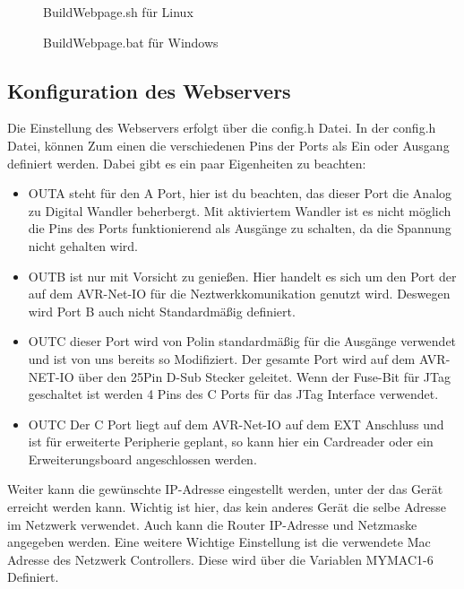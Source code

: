 \begin{figure}[H]

\caption{BuildWebpage.sh für Linux}
\label{output}
\end{figure}

\begin{figure}[H]

\caption{BuildWebpage.bat für Windows}
\label{output}
\end{figure}

\subsection{Konfiguration des Webservers}

Die Einstellung des Webservers erfolgt über die \textrm{config.h} Datei. In der
\textrm{config.h} Datei, können Zum einen die verschiedenen Pins der Ports als Ein oder
Ausgang definiert werden. Dabei gibt es ein paar Eigenheiten zu beachten:
\begin{itemize}
  \item OUTA steht für den A Port, hier ist du beachten, das dieser Port die
  Analog zu Digital Wandler beherbergt. Mit aktiviertem Wandler ist es nicht
  möglich die Pins des Ports funktionierend als Ausgänge zu schalten, da die
  Spannung nicht gehalten wird.
  \item OUTB ist nur mit Vorsicht zu genießen. Hier handelt es sich um den Port
  der auf dem AVR-Net-IO für die Neztwerkkomunikation genutzt wird. Deswegen
  wird Port B auch nicht Standardmäßig definiert.
  \item OUTC dieser Port wird von Polin standardmäßig für die Ausgänge verwendet
  und ist von uns bereits so Modifiziert. Der gesamte Port wird auf dem
  AVR-NET-IO über den 25Pin D-Sub Stecker geleitet. Wenn der Fuse-Bit für JTag
  geschaltet ist werden 4 Pins des C Ports für das JTag Interface verwendet.
  \item OUTC Der C Port liegt auf dem AVR-Net-IO auf dem EXT Anschluss und ist
  für erweiterte Peripherie geplant, so kann hier ein Cardreader oder ein
  Erweiterungsboard angeschlossen werden.
\end{itemize}
Weiter kann die gewünschte IP-Adresse eingestellt werden, unter der das Gerät
erreicht werden kann. Wichtig ist hier, das kein anderes Gerät die selbe Adresse
im Netzwerk verwendet. Auch kann die Router IP-Adresse und Netzmaske angegeben
werden. Eine weitere Wichtige Einstellung ist die verwendete Mac Adresse
des Netzwerk Controllers. Diese wird über die Variablen MYMAC1-6 Definiert.

